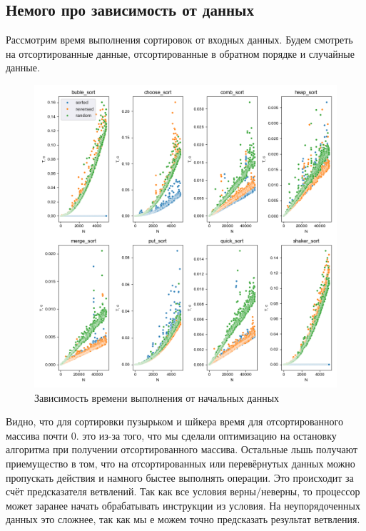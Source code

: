 \documentclass[12pt,a4paper]{article}
\begin{document}
\subsection{Немого про зависимость от данных}
Рассмотрим время выполнения сортировок от входных данных. Будем смотреть на отсортированные данные, отсортированные в обратном порядке и случайные данные.
\begin{figure}[!ht]
\includegraphics[width=\textwidth]{imgs/compare_by_data.png}
\caption{Зависимость времени выполнения от начальных данных}
\end{figure}

Видно, что для сортировки пузырьком и шйкера время для отсортированного массива почти 0. это из-за того, что мы сделали оптимизацию на остановку алгоритма при получении отсортированного массива. Остальные льшь получают приемущество в том, что на отсортированных или перевёрнутых данных можно пропускать действия и намного быстее выполнять операции. Это происходит за счёт предсказателя ветвлений. Так как все условия верны/неверны, то процессор может заранее начать обрабатывать инструкции из условия. На неупорядоченных данных это сложнее, так как мы е можем точно предсказать результат ветвления.
\end{document}
